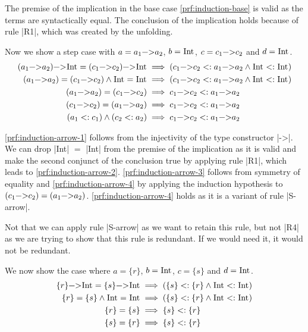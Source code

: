 The premise of the implication in the base case
\ref{prf:induction-base} is valid as the terms are syntactically
equal. The conclusion of the implication holds because of rule
\code|R1|, which was created by the unfolding.

Now we show a step case with $a = a_1 \text{\code|->|} a_2$, $b =
\text{\code|Int|}$, $c = c_1 \text{\code|->|} c_2$ and $d =
\text{\code|Int|}$.
\begin{align}
  (a_1 \text{\code|->|} a_2) \text{\code|->|} \text{\code|Int|} = (c_1
  \text{\code|->|} c_2) \text{\code|->|} \text{\code|Int|} &\implies (
  c_1 \text{\code|->|} c_2 <: a_1 \text{\code|->|} a_2\land
  \text{\code|Int|} <: \text{\code|Int|}) \\
  (a_1 \text{\code|->|} a_2) = (c_1 \text{\code|->|} c_2) \land
  \text{\code|Int|} = \text{\code|Int|} &\implies (c_1
  \text{\code|->|} c_2 <: a_1 \text{\code|->|} a_2 \land
  \text{\code|Int|} <:
  \text{\code|Int|}) \label{prf:induction-arrow-1} \\
  (a_1 \text{\code|->|} a_2) = (c_1 \text{\code|->|} c_2) &\implies
  c_1 \text{\code|->|} c_2 <: a_1 \text{\code|->|}
  a_2 \label{prf:induction-arrow-2} \\
  (c_1 \text{\code|->|} c_2) = (a_1 \text{\code|->|} a_2) &\implies
  c_1 \text{\code|->|} c_2 <: a_1 \text{\code|->|}
  a_2 \label{prf:induction-arrow-3} \\
  (a_1 <: c_1) \land (c_2 <: a_2) &\implies c_1 \text{\code|->|} c_2
  <: a_1 \text{\code|->|} a_2 \label{prf:induction-arrow-4}
\end{align}

\ref{prf:induction-arrow-1} follows from the injectivity of the type
constructor \code|->|. We can drop \code|Int| $=$ \code|Int| from the
premise of the implication as it is valid and make the second conjunct
of the conclusion true by applying rule \code|R1|, which leads to
\ref{prf:induction-arrow-2}. \ref{prf:induction-arrow-3} follows from
symmetry of equality and \ref{prf:induction-arrow-4} by applying
the induction hypothesis to $(c_1 \text{\code|->|} c_2) = (a_1
\text{\code|->|} a_2)$. \ref{prf:induction-arrow-4} holds as it is a
variant of rule \code|S-arrow|.

Not that we can apply rule \code|S-arrow| as we want to retain this
rule, but not \code|R4| as we are trying to show that this rule is
redundant. If we would need it, it would not be redundant.

We now show the case where $a = \{ r \}$, $b = \text{\code|Int|}$, $c
= \{s\}$ and $d = \text{\code|Int|}$.
\begin{align}
  \{ r \} \text{\code|->|} \text{\code|Int|} = \{ s \}
  \text{\code|->|} \text{\code|Int|} &\implies (\{s\} <: \{r\} \land
  \text{\code|Int|} <: \text{\code|Int|}) \\
  \{ r \} = \{ s \} \land \text{\code|Int|} = \text{\code|Int|}
  &\implies (\{s\} <: \{r\} \land \text{\code|Int|} <:
  \text{\code|Int|}) \label{prf:induction-record-1}\\
  \{ r \} = \{ s \} &\implies \{s\} <:
  \{r\} \label{prf:induction-record-2} \\
  \{ s \} = \{ r \} &\implies \{s\} <:
  \{r\} \label{prf:induction-record-3}
\end{align}

